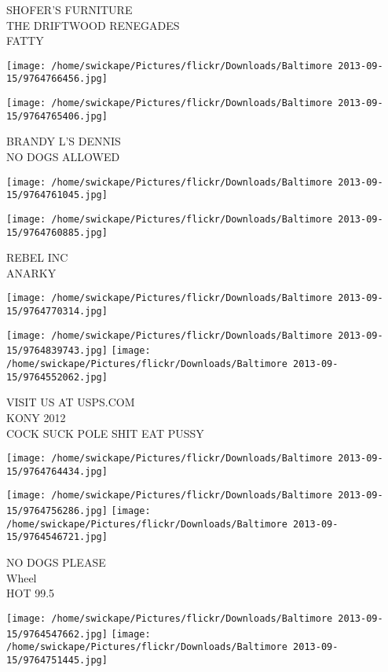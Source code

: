 \documentclass[10pt,letterpaper]{article}
\begin{document}
SHOFER'S FURNITURE\\
THE DRIFTWOOD RENEGADES\\
FATTY
\pagebreak

\texttt{[image: /home/swickape/Pictures/flickr/Downloads/Baltimore 2013-09-15/9764766456.jpg]}

\vspace{0.25in}
\texttt{[image: /home/swickape/Pictures/flickr/Downloads/Baltimore 2013-09-15/9764765406.jpg]}

BRANDY L'S DENNIS\\
NO DOGS ALLOWED
\pagebreak

\texttt{[image: /home/swickape/Pictures/flickr/Downloads/Baltimore 2013-09-15/9764761045.jpg]}

\vspace{0.25in}
\texttt{[image: /home/swickape/Pictures/flickr/Downloads/Baltimore 2013-09-15/9764760885.jpg]}

REBEL INC\\
ANARKY
\pagebreak

\texttt{[image: /home/swickape/Pictures/flickr/Downloads/Baltimore 2013-09-15/9764770314.jpg]}

\vspace{0.25in}
\texttt{[image: /home/swickape/Pictures/flickr/Downloads/Baltimore 2013-09-15/9764839743.jpg]}
\texttt{[image: /home/swickape/Pictures/flickr/Downloads/Baltimore 2013-09-15/9764552062.jpg]}

VISIT US AT USPS.COM\\
KONY 2012\\
COCK SUCK POLE SHIT EAT PUSSY
\pagebreak

\texttt{[image: /home/swickape/Pictures/flickr/Downloads/Baltimore 2013-09-15/9764764434.jpg]}

\vspace{0.25in}
\texttt{[image: /home/swickape/Pictures/flickr/Downloads/Baltimore 2013-09-15/9764756286.jpg]}
\texttt{[image: /home/swickape/Pictures/flickr/Downloads/Baltimore 2013-09-15/9764546721.jpg]}

NO DOGS PLEASE\\
Wheel\\
HOT 99.5
\pagebreak

\texttt{[image: /home/swickape/Pictures/flickr/Downloads/Baltimore 2013-09-15/9764547662.jpg]}
\texttt{[image: /home/swickape/Pictures/flickr/Downloads/Baltimore 2013-09-15/9764751445.jpg]}
\end{document}
